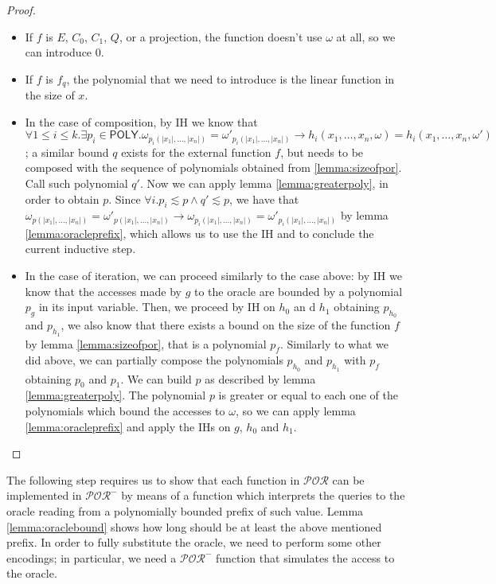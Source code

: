 \documentclass[10pt]{amsart}
\newcommand{\POLY}{\mathsf{POLY}}
\newcommand{\POR}{\mathcal{POR}}
\newcommand{\vone}{x}
\newcommand{\oone}{\omega}
\begin{document}
\begin{proof}
\begin{itemize}
\item If $f$ is $E$, $C_0$, $C_1$, $Q$, or a projection, the function doesn't use $\oone$ at all, so we can introduce $0$.
\item If $f$ is $f_q$, the polynomial that we need to introduce is the linear function in the size of $\vone$.
\item In the case of composition, by IH we know that $\forall 1 \le i\le k. \exists p_i \in \POLY. \oone_{p_i(|\vone_1|, \ldots, |\vone_n|)}= \oone'_{p_i(|\vone_1|, \ldots, |\vone_n|)} \to h_i(\vone_1, \ldots, \vone_n, \oone) = h_i(\vone_1, \ldots, \vone_n, \oone')$; a similar bound $q$ exists for the external function $f$, but needs to be composed with the sequence of polynomials obtained from \ref{lemma:sizeofpor}. Call such polynomial $q'$. Now we can apply lemma \ref{lemma:greaterpoly}, in order to obtain $p$. Since $\forall i. p_i \lesssim p \land q' \lesssim p$, we have that $\oone_{p(|\vone_1|, \ldots, |\vone_n|)} = \oone'_{p(|\vone_1|, \ldots, |\vone_n|)} \to \oone_{p_i(|\vone_1|, \ldots, |\vone_n|)} = \oone'_{p_i(|\vone_1|, \ldots, |\vone_n|)}$ by lemma \ref{lemma:oracleprefix}, which allows us to use the IH and to conclude the current inductive step.
\item In the case of iteration, we can proceed similarly to the case above: by IH we know that the accesses made by $g$ to the oracle are bounded by a polynomial $p_g$ in its input variable. Then, we proceed by IH on $h_0$ an d $h_1$ obtaining $p_{h_0}$ and $p_{h_1}$, we also know that there exists a bound on the size of the function $f$ by lemma \ref{lemma:sizeofpor}, that is a polynomial $p_f$. Similarly to what we did above, we can partially compose the polynomials $p_{h_0}$ and $p_{h_1}$ with $p_f$ obtaining $p_0$ and $p_1$. We can build $p$ as described by lemma \ref{lemma:greaterpoly}. The polynomial $p$ is greater or equal to each one of the polynomials which bound the accesses to $\oone$, so we can apply lemma \ref{lemma:oracleprefix} and apply the IHs on $g$, $h_0$ and $h_1$.
\end{itemize}
\end{proof}

The following step requires us to show that each function in $\POR$ can be implemented in $\POR^-$ by means of a function which interprets the queries to the oracle reading from a polynomially bounded prefix of such value. Lemma \ref{lemma:oraclebound} shows how long should  be at least the above mentioned prefix. In order to fully substitute the oracle, we need to perform some other encodings; in particular, we need a $\POR^-$ function that simulates the access to the oracle.
\end{document}
